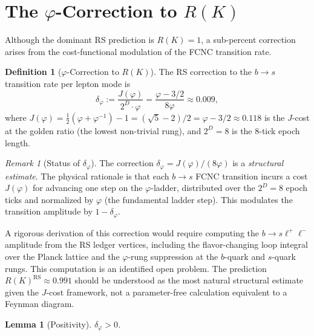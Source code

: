 \documentclass[12pt,a4paper]{article}
\newtheorem{lemma}[theorem]{Lemma}
\theoremstyle{definition}
\newtheorem{definition}[theorem]{Definition}
\theoremstyle{remark}
\newtheorem{remark}[theorem]{Remark}
\begin{document}
\section{The $\varphi$-Correction to $R(K)$}
\label{sec:correction}

Although the dominant RS prediction is $R(K) = 1$, a sub-percent
correction arises from the cost-functional modulation of the FCNC
transition rate.

\begin{definition}[$\varphi$-Correction to $R(K)$]
\label{def:correction}
The RS correction to the $b \to s$ transition rate per lepton mode is
\begin{equation}
  \delta_\varphi := \frac{J(\varphi)}{2^D \cdot \varphi}
  = \frac{\varphi - 3/2}{8\varphi} \approx 0.009,
\end{equation}
where $J(\varphi) = \tfrac{1}{2}(\varphi + \varphi^{-1}) - 1
= (\sqrt{5} - 2)/2 = \varphi - 3/2 \approx 0.118$ is the $J$-cost
at the golden ratio (the lowest non-trivial rung), and $2^D = 8$
is the 8-tick epoch length.
\end{definition}

\begin{remark}[Status of $\delta_\varphi$]
\label{rem:delta-status}
The correction $\delta_\varphi = J(\varphi)/(8\varphi)$ is a
\emph{structural estimate}.  The physical rationale is that each
$b \to s$ FCNC transition incurs a cost $J(\varphi)$ for advancing
one step on the $\varphi$-ladder, distributed over the $2^D = 8$
epoch ticks and normalized by $\varphi$ (the fundamental ladder step).
This modulates the transition amplitude by $1 - \delta_\varphi$.

A rigorous derivation of this correction would require computing the
$b \to s \ell^+\ell^-$ amplitude from the RS ledger vertices, including
the flavor-changing loop integral over the Planck lattice and the
$\varphi$-rung suppression at the $b$-quark and $s$-quark rungs.
This computation is an identified open problem.  The prediction
$R(K)^{\mathrm{RS}} \approx 0.991$ should be understood as the most
natural structural estimate given the $J$-cost framework, not a
parameter-free calculation equivalent to a Feynman diagram.
\end{remark}

\begin{lemma}[Positivity]
\label{lem:pos}
$\delta_\varphi > 0$.
\end{lemma}
\end{document}
